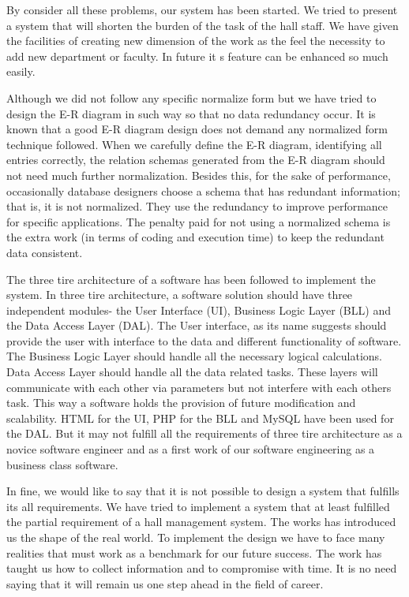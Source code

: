 By consider all these problems, our system has been started. We
tried to present a system that will shorten the burden of the task
of the hall staff. We have given the facilities of creating new
dimension of the work as the feel the necessity to add new
department or faculty. In future it s feature can be enhanced so
much easily.



Although we did not follow any specific normalize form but we have
tried to design the E-R diagram in such way so that no data
redundancy occur. It is known that a good E-R diagram design does
not demand any normalized form technique followed. When we
carefully define the E-R diagram, identifying all entries
correctly, the relation schemas generated from the E-R diagram
should not need much further normalization.  Besides this, for the
sake of performance, occasionally database designers choose a
schema that has redundant information; that is, it is not
normalized. They use the redundancy to improve performance for
specific applications. The penalty paid for not using a normalized
schema is the extra work (in terms of coding and execution time)
to keep the redundant data consistent.



The three tire architecture of a software has been followed to
implement the system. In three tire architecture, a software
solution should have three independent modules- the User Interface
(UI), Business Logic Layer (BLL) and the Data Access Layer (DAL).
The User interface, as its name suggests should provide the user
with interface to the data and different functionality of
software. The Business Logic Layer should handle all the necessary
logical calculations. Data Access Layer should handle all the data
related tasks. These layers will communicate with each other via
parameters but not interfere with each others task. This way a
software holds the provision of future modification and
scalability. HTML for the UI, PHP for the BLL and MySQL have been
used for the DAL.  But it may not fulfill all the requirements of
three tire architecture as a novice software engineer and as a
first work of our software engineering as a business class
software.



In fine, we would like to say that it is not possible to design a
system that fulfills its all requirements. We have tried to
implement a system that at least fulfilled the partial requirement
of a hall management system. The works has introduced us the shape
of the real world. To implement the design we have to face many
realities that must work as a benchmark for our future success.
The work has taught us how to collect information and to
compromise with time. It is no need saying that it will remain us
one step ahead in the field of career.




